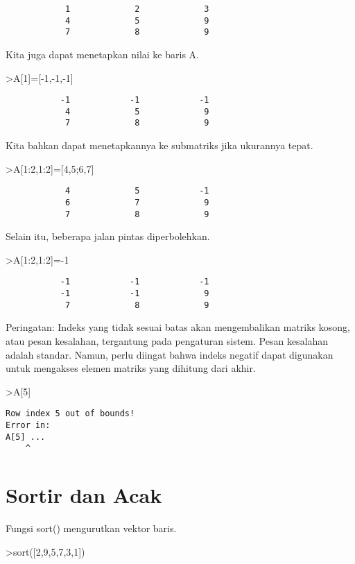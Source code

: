 \documentclass[
]{book}
\begin{document}
\begin{verbatim}
            1             2             3 
            4             5             9 
            7             8             9 
\end{verbatim}

Kita juga dapat menetapkan nilai ke baris A.

\textgreater A{[}1{]}={[}-1,-1,-1{]}

\begin{verbatim}
           -1            -1            -1 
            4             5             9 
            7             8             9 
\end{verbatim}

Kita bahkan dapat menetapkannya ke submatriks jika ukurannya tepat.

\textgreater A{[}1:2,1:2{]}={[}4,5;6,7{]}

\begin{verbatim}
            4             5            -1 
            6             7             9 
            7             8             9 
\end{verbatim}

Selain itu, beberapa jalan pintas diperbolehkan.

\textgreater A{[}1:2,1:2{]}=-1

\begin{verbatim}
           -1            -1            -1 
           -1            -1             9 
            7             8             9 
\end{verbatim}

Peringatan: Indeks yang tidak sesuai batas akan mengembalikan matriks kosong, atau pesan kesalahan, tergantung pada pengaturan sistem. Pesan kesalahan adalah standar. Namun, perlu diingat bahwa indeks negatif dapat digunakan untuk mengakses elemen matriks yang dihitung dari akhir.

\textgreater A{[}5{]}

\begin{verbatim}
Row index 5 out of bounds!
Error in:
A[5] ...
    ^
\end{verbatim}

\chapter{Sortir dan Acak}\label{sortir-dan-acak}

Fungsi sort() mengurutkan vektor baris.

\textgreater sort({[}2,9,5,7,3,1{]})
\end{document}
